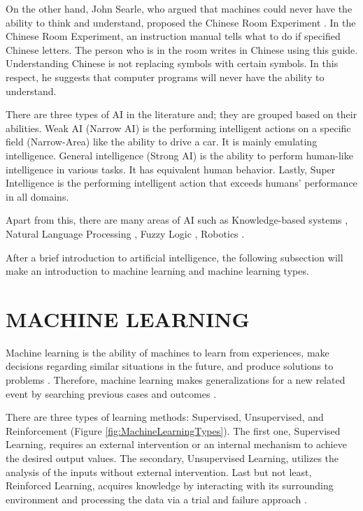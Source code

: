 On the other hand, John Searle, who argued that machines could never have the ability to think and understand, proposed the Chinese Room Experiment \cite{preston2002views}. In the Chinese Room Experiment, an instruction manual tells what to do if specified Chinese letters. The person who is in the room writes in Chinese using this guide. Understanding Chinese is not replacing symbols with certain symbols. In this respect, he suggests that computer programs will never have the ability to understand.

There are three types of AI in the literature and; they are grouped based on their abilities. Weak AI (Narrow AI) \cite{confbringsjord2003artificial} is the performing intelligent actions on a specific field (Narrow-Area) like the ability to drive a car. It is mainly emulating intelligence. General intelligence (Strong AI) \cite{confbringsjord2003artificial} is the ability to perform human-like intelligence in various tasks. It has equivalent human behavior. Lastly, Super Intelligence \cite{bostrom2003ethical} is the performing intelligent action that exceeds humans' performance in all domains.

Apart from this, there are many areas of AI such as Knowledge-based systems \cite{davis1982knowledge}, Natural Language Processing \cite{dale2000handbook}, Fuzzy Logic \cite{zadeh1996fuzzy}, Robotics \cite{brady1984artificial}. 

After a brief introduction to artificial intelligence, the following subsection will make an introduction to machine learning and machine learning types.

\section{MACHINE LEARNING}
Machine learning is the ability of machines to learn from experiences, make decisions regarding similar situations in the future, and produce solutions to problems \cite{booksmichie1994machine}. Therefore, machine learning makes generalizations for a new related event by searching previous cases and outcomes \cite{booksmichie1994machine}.

There are three types of learning methods: Supervised, Unsupervised, and Reinforcement (Figure \ref{fig:MachineLearningTypes}). The first one, Supervised Learning, requires an external intervention or an internal mechanism to achieve the desired output values. The secondary, Unsupervised Learning, utilizes  the analysis of the inputs without external intervention. Last but not least, Reinforced Learning, acquires knowledge by interacting with its surrounding environment and processing the data via a trial and failure approach \cite{sathya2013comparison}.

